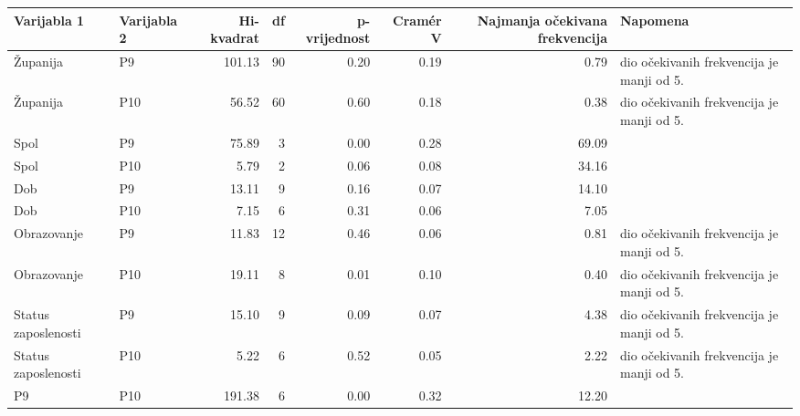 \begin{tabular}{llrrrrrl}
\toprule
Varijabla 1 & Varijabla 2 & Hi-kvadrat & df & p-vrijednost & Cramér V & Najmanja očekivana frekvencija & Napomena \\
\midrule
Županija & P9 & 101.13 & 90 & 0.20 & 0.19 & 0.79 & dio očekivanih frekvencija je manji od 5. \\
Županija & P10 & 56.52 & 60 & 0.60 & 0.18 & 0.38 & dio očekivanih frekvencija je manji od 5. \\
Spol & P9 & 75.89 & 3 & 0.00 & 0.28 & 69.09 &  \\
Spol & P10 & 5.79 & 2 & 0.06 & 0.08 & 34.16 &  \\
Dob & P9 & 13.11 & 9 & 0.16 & 0.07 & 14.10 &  \\
Dob & P10 & 7.15 & 6 & 0.31 & 0.06 & 7.05 &  \\
Obrazovanje & P9 & 11.83 & 12 & 0.46 & 0.06 & 0.81 & dio očekivanih frekvencija je manji od 5. \\
Obrazovanje & P10 & 19.11 & 8 & 0.01 & 0.10 & 0.40 & dio očekivanih frekvencija je manji od 5. \\
Status zaposlenosti & P9 & 15.10 & 9 & 0.09 & 0.07 & 4.38 & dio očekivanih frekvencija je manji od 5. \\
Status zaposlenosti & P10 & 5.22 & 6 & 0.52 & 0.05 & 2.22 & dio očekivanih frekvencija je manji od 5. \\
P9 & P10 & 191.38 & 6 & 0.00 & 0.32 & 12.20 &  \\
\bottomrule
\end{tabular}
